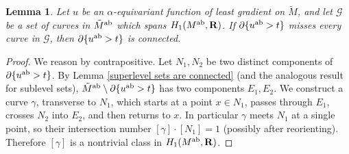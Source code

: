 \documentclass[reqno,11pt]{amsart}
\newcommand{\RR}{\mathbf{R}}
\newtheorem{lemma}[theorem]{Lemma}
\theoremstyle{definition}
\numberwithin{equation}{section}
\begin{document}
\begin{lemma}\label{abelian cover connected}
Let $u$ be an $\alpha$-equivariant function of least gradient on $\tilde M$, and let $\mathscr G$ be a set of curves in $\tilde M^{\rm ab}$ which spans $H_1(M^{\rm ab}, \RR)$.
If $\partial \{u^{\rm ab} > t\}$ misses every curve in $\mathscr G$, then $\partial \{u^{\rm ab} > t\}$ is connected.
\end{lemma}
\begin{proof}
We reason by contrapositive.
Let $N_1, N_2$ be two distinct components of $\partial \{u^{\rm ab} > t\}$.
By Lemma \ref{superlevel sets are connected} (and the analogous result for sublevel sets), $\tilde M^{\rm ab} \setminus \partial \{u^{\rm ab} > t\}$ has two components $E_1, E_2$.
We construct a curve $\gamma$, transverse to $N_1$, which starts at a point $x \in N_1$, passes through $E_1$, crosses $N_2$ into $E_2$, and then returns to $x$.
In particular $\gamma$ meets $N_1$ at a single point, so their intersection number $[\gamma] \cdot [N_1] = 1$ (possibly after reorienting).
Therefore $[\gamma]$ is a nontrivial class in $H_1(M^{\rm ab}, \RR)$.
\end{proof}
\end{document}
